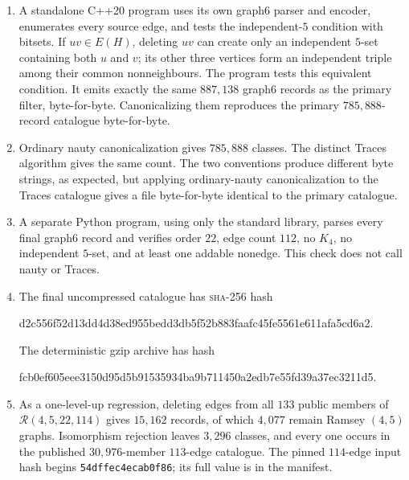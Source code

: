 \documentclass[10pt]{article}
\theoremstyle{definition}
\theoremstyle{remark}
\newcommand{\Rcal}{\mathcal{R}}
\newcommand{\sha}{\textsc{sha-256}}
\begin{document}
\begin{enumerate}[leftmargin=*]
  \item A standalone C++20 program uses its own graph6 parser and encoder,
  enumerates every source edge, and tests the independent-$5$ condition with
  bitsets.  If $uv\in E(H)$, deleting $uv$ can create only an independent
  $5$-set containing both $u$ and $v$; its other three vertices form an
  independent triple among their common nonneighbours.  The program tests
  this equivalent condition.  It emits exactly the same $887{,}138$ graph6
  records as the primary filter, byte-for-byte.  Canonicalizing them
  reproduces the primary $785{,}888$-record catalogue byte-for-byte.

  \item Ordinary nauty canonicalization gives $785{,}888$ classes.
  The distinct Traces algorithm gives the same count.  The two
  conventions produce different byte strings, as expected, but applying
  ordinary-nauty canonicalization to the Traces catalogue gives a file
  byte-for-byte identical to the primary catalogue.

  \item A separate Python program, using only the standard library, parses
  every final graph6 record and verifies order $22$, edge count $112$, no
  $K_4$, no independent $5$-set, and at least one addable nonedge.  This
  check does not call nauty or Traces.

  \item The final uncompressed catalogue has \sha{} hash
  \begin{center}
  \small\ttfamily
  d2c556f52d13dd4d38ed955bedd3db5f52b883faafc45fe5561e611afa5cd6a2.
  \end{center}
  The deterministic gzip archive has hash
  \begin{center}
  \small\ttfamily
  fcb0ef605eee3150d95d5b91535934ba9b711450a2edb7e55fd39a37ec3211d5.
  \end{center}

  \item As a one-level-up regression, deleting edges from all $133$ public
  members of $\Rcal(4,5,22,114)$ gives $15{,}162$ records, of which $4{,}077$
  remain Ramsey $(4,5)$ graphs.  Isomorphism rejection leaves $3{,}296$
  classes, and every one occurs in the published $30{,}976$-member
  $113$-edge catalogue.  The pinned $114$-edge input hash begins
  \texttt{54dffec4ecab0f86}; its full value is in the manifest.
\end{enumerate}
\end{document}
